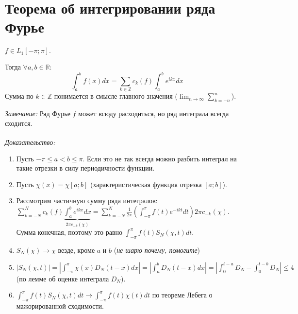 \documentclass[paper=a4, fontsize=17pt]{article}
\begin{document}
\section{Теорема об интегрировании ряда Фурье}
$f \in L_1[-\pi;\pi]$.

Тогда $\forall a, b \in \mathbb{R}$:
$$\int_a^b f(x)dx = \sum_{k\in\mathbb{Z}} c_k(f) \int_a^b e^{ikx} dx$$
Сумма по $k \in \mathbb{Z}$ понимается в смысле главного значения ($\lim_{n \to \infty} \sum_{k=-n}^n$).

\emph{Замечание:} Ряд Фурье $f$ может всюду расходиться, но ряд интеграла всегда сходится.
\\\\
\emph{Доказательство:}

\begin{enumerate}
    \item Пусть $-\pi \leq a < b \leq \pi$. Если это не так всегда можно разбить интеграл на такие отрезки в силу периодичности функции.
    \item Пусть $\chi(x) = \chi[a;b]$ (характеристическая функция отрезка $[a;b]$).
    \item Рассмотрим частичную сумму ряда интегралов:\\
        $\sum_{k=-N}^N c_k(f) \underbrace{\int_a^b e^{ikx} dx}_{2\pi c_{-k}(\chi)} =
        \sum_{k=-N}^N \frac{1}{2\pi} (\int_{-\pi}^\pi f(t) e^{-ikt} dt) 2\pi c_{-k}(\chi)$.\\
        Сумма конечная, поэтому это равно $\int_{-\pi}^{\pi} f(t) S_N(\chi,t) dt$.
    \item $S_N(\chi) \to \chi$ везде, кроме $a$ и $b$ (\emph{не шарю почему, помогите})
    \item $|S_N(\chi,t)| = |\int_{-\pi}^\pi \chi(x)D_N(t-x)dx| = |\int_a^b D_N(t-x)dx| =
        |\int_0^{t-a}D_N - \int_0^{t-b}D_N| \leq 4$ (по лемме об оценке интеграла $D_N$).
    \item $\int_{-\pi}^\pi f(t)S_N(\chi,t) dt \to \int_{-\pi}^\pi f(t) \chi(t) dt$ по теореме Лебега о мажорированной сходимости.
\end{enumerate}
\end{document}
